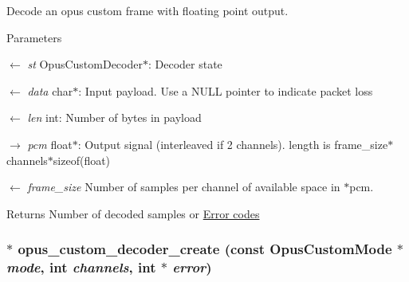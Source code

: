 Decode an opus custom frame with floating point output. 
\begin{DoxyParams}{Parameters}
\item[\mbox{$\leftarrow$} {\em st}]{\ttfamily OpusCustomDecoder$\ast$}: Decoder state \item[\mbox{$\leftarrow$} {\em data}]{\ttfamily char$\ast$}: Input payload. Use a NULL pointer to indicate packet loss \item[\mbox{$\leftarrow$} {\em len}]{\ttfamily int}: Number of bytes in payload \item[\mbox{$\rightarrow$} {\em pcm}]{\ttfamily float$\ast$}: Output signal (interleaved if 2 channels). length is frame\_\-size$\ast$channels$\ast$sizeof(float) \item[\mbox{$\leftarrow$} {\em frame\_\-size}]Number of samples per channel of available space in $\ast$pcm. \end{DoxyParams}
\begin{DoxyReturn}{Returns}
Number of decoded samples or \hyperlink{group__opus__errorcodes}{Error codes} 
\end{DoxyReturn}
\hypertarget{group__opus__custom_ga16e5e655999536285638cac5e80673db}{
\subsubsection[{opus\_\-custom\_\-decoder\_\-create}]{$\ast$ opus\_\-custom\_\-decoder\_\-create (const {\bf OpusCustomMode} $\ast$ {\em mode}, \/  int {\em channels}, \/  int $\ast$ {\em error})}}
\label{group__opus__custom_ga16e5e655999536285638cac5e80673db}


